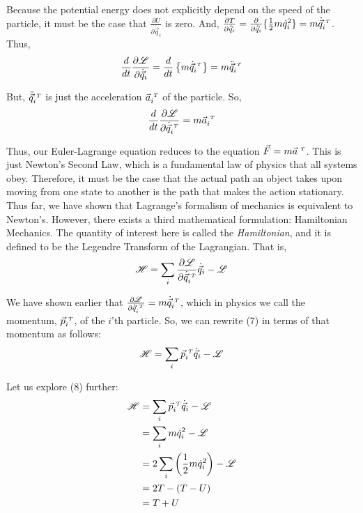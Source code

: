 \documentclass[12pt]{article}
\newcommand{\Lagr}	{\mathscr{L}}		%
\newcommand{\Haml}	{\mathscr{H}}		%
\newcommand{\q}		{\vec{q}}
\newcommand{\p}		{\vec{p}}
\newcommand{\F}		{\vec{F}}
\newcommand{\T}		{{\hspace{0.1cm} \scriptscriptstyle{T}}}
\begin{document}
Because the potential energy does not explicitly depend on the speed of the particle, it must be the case that $\frac{\partial U}{\partial \dot{\q}_i}$ is zero. And, $\frac{\partial T}{\partial \dot{\q}_i} = \frac{\partial}{\partial \dot{\q}_i} \{ \frac{1}{2} m \dot{q}_i^2 \} = m\dot{\q}^\T_i$. Thus,
\begin{align*}
\frac{d}{dt} \frac{\partial \Lagr}{\partial \dot{\q}_i}	
	= \frac{d}{dt} \left\{ m\dot{\q}^\T_i \right\} = m\ddot{\q}^\T_i 
\end{align*}

But, $\ddot{\q}^\T_i$ is just the acceleration $\vec{a}^\T_i$ of the particle. So,
\begin{equation*}
\frac{d}{dt} \frac{\partial \Lagr}{\partial \dot{\q}^\T_i} = m\vec{a}^\T_i	
\end{equation*}

Thus, our Euler-Lagrange equation reduces to the equation $\F=m\vec{a}^\T$. This is just Newton's Second Law, which is a fundamental law of physics that all systems obey. Therefore, it must be the case that the actual path an object takes upon moving from one state to another is the path that makes the action stationary. \\


Thus far, we have shown that Lagrange's formalism of mechanics is equivalent to Newton's. However, there exists a third mathematical formulation: Hamiltonian Mechanics. The quantity of interest here is called the \textit{Hamiltonian}, and it is defined to be the Legendre Transform of the Lagrangian. That is,
\begin{equation}
\Haml = \sum_i \frac{\partial \Lagr}{\partial \dot{\q}^\T_i} \dot{\q}_i - \Lagr
\end{equation}

We have shown earlier that $\frac{\partial \Lagr}{\partial \dot{\q}^\T_i} = m\dot{\q}^\T_i$, which in physics we call the momentum, $\p_i^\T$, of the $i$'th particle. So, we can rewrite (7) in terms of that momentum as follows:
\begin{equation}
\Haml = \sum_i \p_i^\T \dot{\q}_i - \Lagr
\end{equation}

Let us explore (8) further:
\begin{align*}
\Haml 	&= \sum_i \p_i^\T \dot{\q}_i - \Lagr	\\
		&= \sum_i m \dot{q}_i^2 - \Lagr	\\
		&= 2 \sum_i \left( \frac{1}{2} m \dot{q}_i^2 \right) - \Lagr	\\
		&= 2 T - (T - U)	\\
		&= T + U
\end{align*}
\end{document}
